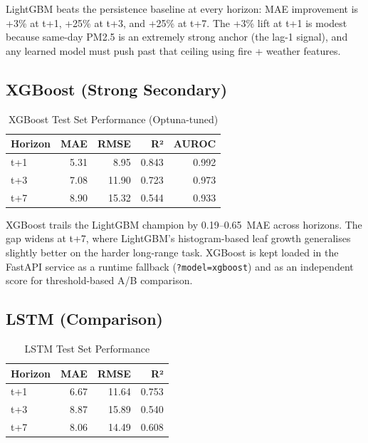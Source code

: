 LightGBM beats the persistence baseline at every horizon: MAE improvement is
+3\% at t+1, +25\% at t+3, and +25\% at t+7. The +3\% lift at t+1 is modest
because same-day PM2.5 is an extremely strong anchor (the lag-1 signal), and
any learned model must push past that ceiling using fire + weather features.

\subsection{XGBoost (Strong Secondary)}

\begin{table}[H]
\centering
\caption{XGBoost Test Set Performance (Optuna-tuned)}
\label{tab:xgb_results}
\begin{tabular}{lrrrr}
\toprule
\textbf{Horizon} & \textbf{MAE} & \textbf{RMSE} & \textbf{R²} & \textbf{AUROC} \\
\midrule
t+1 & 5.31 & 8.95  & 0.843 & 0.992 \\
t+3 & 7.08 & 11.90 & 0.723 & 0.973 \\
t+7 & 8.90 & 15.32 & 0.544 & 0.933 \\
\bottomrule
\end{tabular}
\end{table}

XGBoost trails the LightGBM champion by 0.19--0.65~MAE across horizons. The gap
widens at t+7, where LightGBM's histogram-based leaf growth generalises slightly
better on the harder long-range task. XGBoost is kept loaded in the FastAPI
service as a runtime fallback (\texttt{?model=xgboost}) and as an independent
score for threshold-based A/B comparison.

\subsection{LSTM (Comparison)}

\begin{table}[H]
\centering
\caption{LSTM Test Set Performance}
\label{tab:lstm_results}
\begin{tabular}{lrrr}
\toprule
\textbf{Horizon} & \textbf{MAE} & \textbf{RMSE} & \textbf{R²} \\
\midrule
t+1 & 6.67 & 11.64 & 0.753 \\
t+3 & 8.87 & 15.89 & 0.540 \\
t+7 & 8.06 & 14.49 & 0.608 \\
\bottomrule
\end{tabular}
\end{table}

